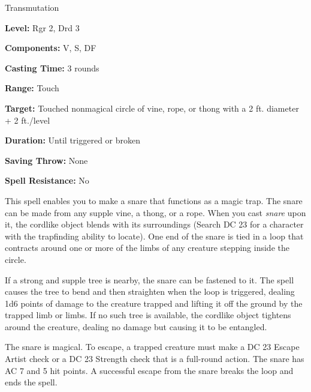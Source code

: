 
Transmutation

\textbf{Level:} Rgr 2, Drd 3

\textbf{Components:} V, S, DF

\textbf{Casting Time:} 3 rounds

\textbf{Range:} Touch

\textbf{Target:} Touched nonmagical circle of vine, rope, or thong with a 2 ft. 
diameter + 2 ft./level

\textbf{Duration:} Until triggered or broken

\textbf{Saving Throw:} None

\textbf{Spell Resistance:} No

This spell enables you to make a snare that functions as a magic trap. The snare 
can be made from any supple vine, a thong, or a rope. When you cast \textit{snare 
}upon it, the cordlike object blends with its surroundings (Search DC 23 for a 
character with the trapfinding ability to locate). One end of the snare is tied 
in a loop that contracts around one or more of the limbs of any creature stepping 
inside the circle.

If a strong and supple tree is nearby, the snare can be fastened to it. The spell 
causes the tree to bend and then straighten when the loop is triggered, dealing 
1d6 points of damage to the creature trapped and lifting it off the ground by the 
trapped limb or limbs. If no such tree is available, the cordlike object tightens 
around the creature, dealing no damage but causing it to be entangled.

The snare is magical. To escape, a trapped creature must make a DC 23 Escape Artist 
check or a DC 23 Strength check that is a full-round action. The snare has AC 7 
and 5 hit points. A successful escape from the snare breaks the loop and ends the 
spell.

